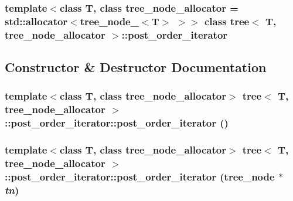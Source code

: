 \subsubsection*{template$<$class T, class tree\_\-node\_\-allocator = std::allocator$<$tree\_\-node\_\-$<$T$>$ $>$$>$ class tree$<$ T, tree\_\-node\_\-allocator $>$::post\_\-order\_\-iterator}



\subsection{Constructor \& Destructor Documentation}
\hypertarget{classtree_1_1post__order__iterator_f6d2a1ff77da1ca318447faef819fb22}{
\subsubsection{\setlength{\rightskip}{0pt plus 5cm}template$<$class T, class tree\_\-node\_\-allocator$>$ {\bf tree}$<$ T, tree\_\-node\_\-allocator $>$::post\_\-order\_\-iterator::post\_\-order\_\-iterator ()}}
\label{classtree_1_1post__order__iterator_f6d2a1ff77da1ca318447faef819fb22}


\hypertarget{classtree_1_1post__order__iterator_add3e555f6a69c1799cb5b9b12e3ef48}{
\subsubsection{\setlength{\rightskip}{0pt plus 5cm}template$<$class T, class tree\_\-node\_\-allocator$>$ {\bf tree}$<$ T, tree\_\-node\_\-allocator $>$::post\_\-order\_\-iterator::post\_\-order\_\-iterator ({\bf tree\_\-node} $\ast$ {\em tn})}}
\label{classtree_1_1post__order__iterator_add3e555f6a69c1799cb5b9b12e3ef48}


